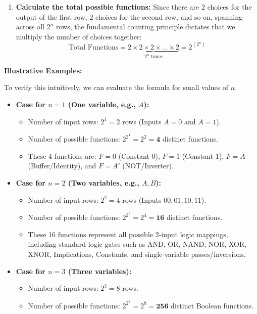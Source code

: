 \documentclass[12pt,a3paper]{article}
\begin{document}
\begin{enumerate}
\begin{tcolorbox}[enhanced,breakable,ansbox,colback=cA!4,colframe=cA,boxrule=0.8pt,arc=5pt,title={\textbf{Answer}},fonttitle=\bfseries\color{white},colbacktitle=cA]
\begin{enumerate}
    \item \textbf{Calculate the total possible functions:}
    Since there are $2$ choices for the output of the first row, $2$ choices for the second row, and so on, spanning across all $2^n$ rows, the fundamental counting principle dictates that we multiply the number of choices together:
    \[ \text{Total Functions} = \underbrace{2 \times 2 \times 2 \times \dots \times 2}_{2^n \text{ times}} = 2^{(2^n)} \]
\end{enumerate}

\vspace{0.3cm}
\textbf{Illustrative Examples:}

To verify this intuitively, we can evaluate the formula for small values of $n$.

\begin{itemize}
    \item \textbf{Case for $n = 1$ (One variable, e.g., $A$):}
    \begin{itemize}
        \item Number of input rows: $2^1 = 2$ rows (Inputs $A=0$ and $A=1$).
        \item Number of possible functions: $2^{2^1} = 2^2 = \mathbf{4}$ distinct functions.
        \item These 4 functions are: $F = 0$ (Constant 0), $F = 1$ (Constant 1), $F = A$ (Buffer/Identity), and $F = A'$ (NOT/Inverter).
    \end{itemize}
    
    \vspace{0.2cm}
    \item \textbf{Case for $n = 2$ (Two variables, e.g., $A, B$):}
    \begin{itemize}
        \item Number of input rows: $2^2 = 4$ rows (Inputs $00, 01, 10, 11$).
        \item Number of possible functions: $2^{2^2} = 2^4 = \mathbf{16}$ distinct functions.
        \item These 16 functions represent all possible 2-input logic mappings, including standard logic gates such as AND, OR, NAND, NOR, XOR, XNOR, Implications, Constants, and single-variable passes/inversions.
    \end{itemize}
    
    \vspace{0.2cm}
    \item \textbf{Case for $n = 3$ (Three variables):}
    \begin{itemize}
        \item Number of input rows: $2^3 = 8$ rows.
        \item Number of possible functions: $2^{2^3} = 2^8 = \mathbf{256}$ distinct Boolean functions.
    \end{itemize}
\end{itemize}


\end{tcolorbox}
\end{enumerate}
\end{document}
